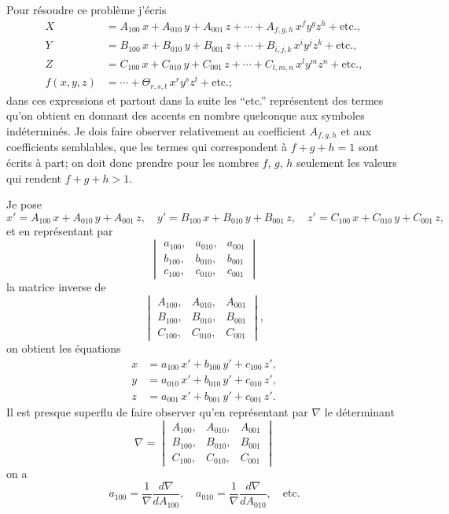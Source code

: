 \documentclass[11pt,a4paper]{article}
\begin{document}
Pour r\'esoudre ce probl\`eme j'\'ecris
\begin{align*}
X &= A_{100}\,x + A_{010}\,y + A_{001}\,z + \cdots + A_{f,g,h}\,x^f y^g z^h + \text{etc.}, \\
Y &= B_{100}\,x + B_{010}\,y + B_{001}\,z + \cdots + B_{i,j,k}\,x^i y^j z^k + \text{etc.}, \\
Z &= C_{100}\,x + C_{010}\,y + C_{001}\,z + \cdots + C_{l,m,n}\,x^l y^m z^n + \text{etc.}, \\
f(x,y,z) &= \cdots + \Theta_{r,s,t}\,x^r y^s z^t + \text{etc.};
\end{align*}
dans ces expressions et partout dans la suite les ``etc.'' repr\'esentent des
termes qu'on obtient en donnant des accents en nombre quelconque aux symboles
ind\'etermin\'es. Je dois faire observer relativement au coefficient $A_{f,g,h}$ et
aux coefficients semblables, que les termes qui correspondent \`a $f+g+h=1$ sont
\'ecrits \`a part; on doit donc prendre pour les nombres $f$, $g$, $h$ seulement
les valeurs qui rendent $f+g+h>1$.

\setcounter{page}{55}

Je pose
\[
x' = A_{100}\,x + A_{010}\,y + A_{001}\,z, \quad
y' = B_{100}\,x + B_{010}\,y + B_{001}\,z, \quad
z' = C_{100}\,x + C_{010}\,y + C_{001}\,z,
\]
et en repr\'esentant par
\[
\begin{vmatrix}
a_{100}, & a_{010}, & a_{001} \\
b_{100}, & b_{010}, & b_{001} \\
c_{100}, & c_{010}, & c_{001}
\end{vmatrix}
\]
la matrice inverse de
\[
\begin{vmatrix}
A_{100}, & A_{010}, & A_{001} \\
B_{100}, & B_{010}, & B_{001} \\
C_{100}, & C_{010}, & C_{001}
\end{vmatrix},
\]
on obtient les \'equations
\begin{align*}
x &= a_{100}\,x' + b_{100}\,y' + c_{100}\,z', \\
y &= a_{010}\,x' + b_{010}\,y' + c_{010}\,z', \\
z &= a_{001}\,x' + b_{001}\,y' + c_{001}\,z'.
\end{align*}
Il est presque superflu de faire observer qu'en repr\'esentant par $\nabla$ le
d\'eterminant
\[
\nabla = \begin{vmatrix}
A_{100}, & A_{010}, & A_{001} \\
B_{100}, & B_{010}, & B_{001} \\
C_{100}, & C_{010}, & C_{001}
\end{vmatrix}
\]
on a
\[
a_{100} = \frac{1}{\nabla}\frac{d\nabla}{dA_{100}}, \quad
a_{010} = \frac{1}{\nabla}\frac{d\nabla}{dA_{010}}, \quad \text{etc.}
\]
\end{document}
